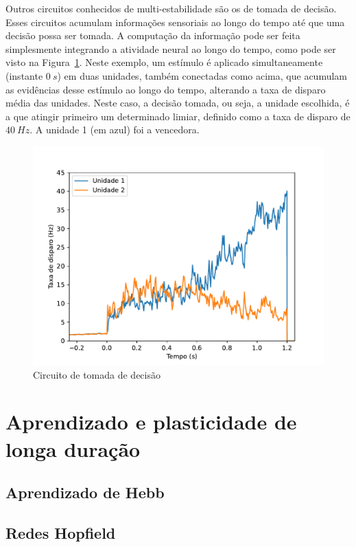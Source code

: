 Outros circuitos conhecidos de multi-estabilidade são os de tomada de decisão. Esses circuitos acumulam informações sensoriais ao longo do tempo até que uma decisão possa ser tomada. A computação da informação pode ser feita simplesmente integrando a atividade neural ao longo do tempo,
como pode ser visto na Figura~\ref{fig:tomadadecisao}. Neste exemplo, um estímulo é aplicado simultaneamente (instante $0\ s$) em duas unidades, também conectadas como acima, que acumulam as evidências desse estímulo ao longo do tempo, alterando a taxa de disparo média das unidades. Neste caso, a decisão tomada, ou seja, a unidade escolhida, é a que atingir primeiro um determinado limiar, definido como a taxa de disparo de $40\ Hz$. A unidade 1 (em azul) foi a vencedora.
\begin{figure}[tb]
	\centering
	\caption[Circuito de tomada de decisão]{Circuito de tomada de decisão}
	\label{fig:tomadadecisao}
	\includegraphics[width=0.7\linewidth]{figs/tomada_decisao}
\end{figure}


\section{Aprendizado e plasticidade de longa duração}\label{sec:aprendizado}

\subsection{Aprendizado de Hebb}

\subsection{Redes Hopfield}

